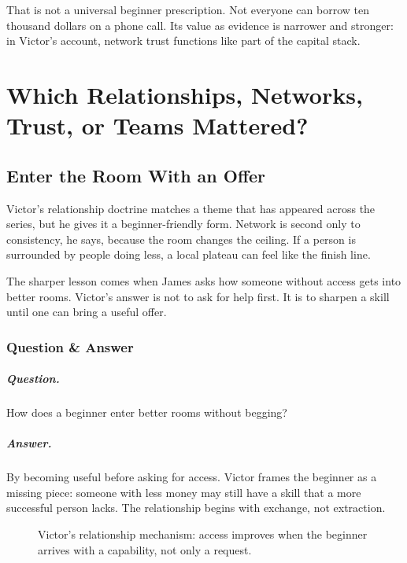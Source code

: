 \documentclass[11pt,oneside]{book}
\begin{document}
That is not a universal beginner prescription. Not everyone can borrow ten thousand dollars on a phone call. Its value as evidence is narrower and stronger: in Victor's account, network trust functions like part of the capital stack.

\chapter{Which Relationships, Networks, Trust, or Teams Mattered?}

\section{Enter the Room With an Offer}

Victor's relationship doctrine matches a theme that has appeared across the series, but he gives it a beginner-friendly form. Network is second only to consistency, he says, because the room changes the ceiling. If a person is surrounded by people doing less, a local plateau can feel like the finish line.

The sharper lesson comes when James asks how someone without access gets into better rooms. Victor's answer is not to ask for help first. It is to sharpen a skill until one can bring a useful offer.

\subsection{Question \& Answer}

\paragraph{Question.}
How does a beginner enter better rooms without begging?

\paragraph{Answer.}
By becoming useful before asking for access. Victor frames the beginner as a missing piece: someone with less money may still have a skill that a more successful person lacks. The relationship begins with exchange, not extraction.

\begin{figure}[h]
\centering
{}
\caption{Victor's relationship mechanism: access improves when the beginner arrives with a capability, not only a request.}
\end{figure}
\end{document}
